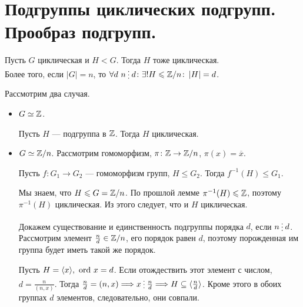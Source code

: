 % 
% 
\section{Подгруппы циклических подгрупп. Прообраз подгрупп.}
\begin{thm}
    Пусть $G $ циклическая и $ H < G$. Тогда  $ H$ тоже циклическая.\\ Более того, если $ \left| G \right|  = n$,  то $ \forall d ~ n \del d\colon \exists! H \le \Z/n\colon \left| H \right| = d$. 
\end{thm}
\begin{myproof*}
    Рассмотрим два случая.
    \begin{itemize}
	\item $ G\simeq  \mathbb{Z}$.
	    \begin{lm}
	        Пусть $ H$ --- подгруппа в  $ \mathbb{Z}$. Тогда  $H $ циклическая.
	    \end{lm}
	\item $  G \simeq \mathbb{Z} / n$. Рассмотрим гомоморфизм, $ \pi\colon \mathbb{Z} \to  \mathbb{Z} / n$, $ \pi(x) = \overline{x}$.
	    \begin{lm}
		Пусть $ f\colon G_1 \to  G_2$ --- гомоморфизм групп, $ H \le G_2$. Тогда $ f^{-1}(H) \le G_1$.
	    \end{lm}
	    Мы знаем, что $ H \leqslant G = \mathbb{Z} /n$. По прошлой лемме $ \pi^{-1}(H) \leqslant \mathbb{Z}$, поэтому $ \pi^{-1}(H)$ циклическая. Из этого следует, что и $ H$ циклическая.

	    Докажем существование и единственность подгруппы порядка  $ d$, если  $ n \del d$. Рассмотрим элемент   $ \frac{n}{d} \in  \mathbb{Z} /n$, его порядок равен $ d$, поэтому порожденная им группа будет иметь такой же порядок.

	    Пусть  $ H = \langle x \rangle, ~ {\mathop{\text{\rm ord}}}~ x = d$. Если отождествить этот элемент с числом,  $ d = \frac{n}{(n, x)}$. Тогда $ \frac{n}{d} = (n, x) \Longrightarrow x \del \frac{n}{d} \Longrightarrow  H \subseteq \langle \frac{n}{d} \rangle$. Кроме этого в обоих группах $ d$ элементов, следовательно, они совпали.
    \end{itemize}
\end{myproof*}
% 
